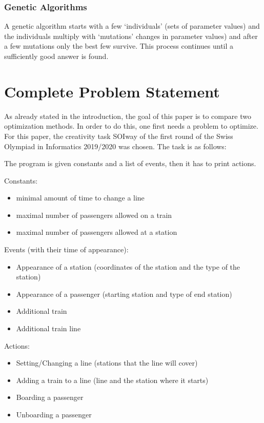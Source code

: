 \documentclass[10pt]{report}
\begin{document}
\subsection{Genetic Algorithms}
A genetic algorithm starts with a few ‘individuals’ (sets of parameter values) and the individuals multiply with ‘mutations’ \cite{genalg1} changes in parameter values) and after a few mutations only the best few survive. This process continues until a sufficiently good answer is found. \cite{genalg2}  %


\chapter{Complete Problem Statement}

As already stated in the introduction, the goal of this paper is to compare two optimization methods. In order to do this, one first needs a problem to optimize. For this paper, the creativity task SOIway of the first round of the Swiss Olympiad in Informatics 2019/2020 was chosen. The task is as follows:

The program is given constants and a list of events, then it has to print actions.

Constants:
\begin{itemize}
    \item minimal amount of time to change a line
    \item maximal number of passengers allowed on a train
    \item maximal number of passengers allowed at a station
\end{itemize}


Events (with their time of appearance):
\begin{itemize}
    \item Appearance of a station (coordinates of the station and the type of the station)
    \item Appearance of a passenger (starting station and type of end station)
    \item Additional train
    \item Additional train line
\end{itemize}

Actions:
\begin{itemize}
    \item Setting/Changing a line (stations that the line will cover)
    \item Adding a train to a line (line and the station where it starts)
    \item Boarding a passenger
    \item Unboarding a passenger
\end{itemize}
\end{document}
